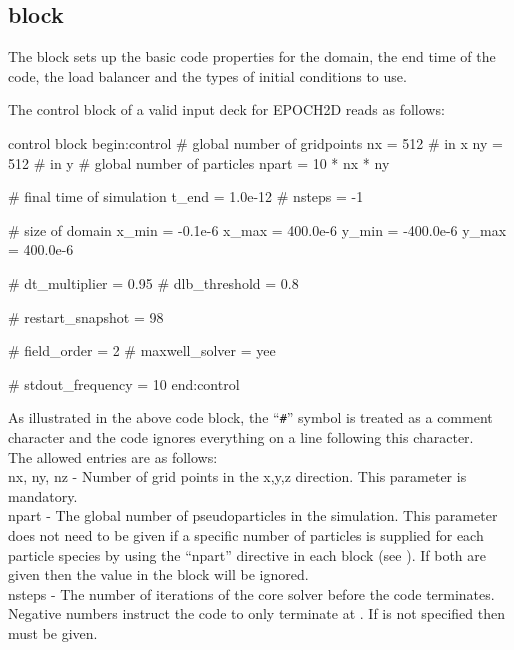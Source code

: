 \subsection{\texorpdfstring
  { block}
  {           {control} block}}
\label{sec:control_block}
The  block sets up the basic code properties for the
domain, the end time of the code, the load balancer and the types of initial
conditions to use.

The control block of a valid input deck for EPOCH2D reads as follows:
\begin{lboxverbatim}{control block}
begin:control
   # global number of gridpoints
   nx = 512 # in x
   ny = 512 # in y
   # global number of particles
   npart = 10 * nx * ny

   # final time of simulation
   t_end = 1.0e-12
   # nsteps = -1

   # size of domain
   x_min = -0.1e-6
   x_max = 400.0e-6
   y_min = -400.0e-6
   y_max = 400.0e-6

   # dt_multiplier = 0.95
   # dlb_threshold = 0.8

   # restart_snapshot = 98

   # field_order = 2
   # maxwell_solver = yee

   # stdout_frequency = 10
end:control
\end{lboxverbatim}

As illustrated in the above code block, the ``{\texttt{\#}}'' symbol is treated
as a comment character and the code ignores everything on a line following this
character.\\

The allowed entries are as follows:\\

{\emphtext nx, ny, nz} - Number of grid points in the x,y,z direction. This
parameter is mandatory.\\

{\emphtext npart} - The global number of pseudoparticles in the
simulation. This parameter does not need to be given if a specific number
of particles is supplied for each particle species by using the ``npart''
directive in each  block (see ). If both are
given then the value in the  block will be ignored.\\

{\emphtext nsteps} - The number of iterations of the core solver before the
code terminates. Negative numbers instruct the code to only terminate at
. If  is not specified then
 must be given.\\

